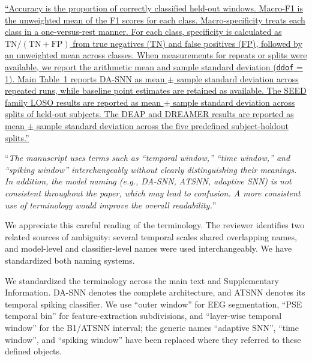 \documentclass[12pt,technote,onecolumn]{IEEEtran}
\begin{document}
\uline{``Accuracy is the proportion of correctly classified held-out windows. Macro-F1 is the unweighted mean of the F1 scores for each class. Macro-specificity treats each class in a one-versus-rest manner. For each class, specificity is calculated as $\mathrm{TN}/(\mathrm{TN}+\mathrm{FP})$ from true negatives (TN) and false positives (FP), followed by an unweighted mean across classes. When measurements for repeats or splits were available, we report the arithmetic mean and sample standard deviation (\texttt{ddof} = 1). Main Table~1 reports DA-SNN as mean $\pm$ sample standard deviation across repeated runs, while baseline point estimates are retained as available. The SEED family LOSO results are reported as mean $\pm$ sample standard deviation across splits of held-out subjects. The DEAP and DREAMER results are reported as mean $\pm$ sample standard deviation across the five predefined subject-holdout splits.''}

\EvidenceMainTableOne
\EvidenceSuppTableSSix
\EvidenceSuppTableSSeven
\EvidenceSuppTableSEight

\vspace{4mm}

``{\it The manuscript uses terms such as ``temporal window,'' ``time window,''
and ``spiking window'' interchangeably without clearly distinguishing
their meanings. In addition, the model naming (e.g., DA-SNN, ATSNN,
adaptive SNN) is not consistent throughout the paper, which may lead to
confusion. A more consistent use of terminology would improve the
overall readability.}''
\vspace{1mm}


We appreciate this careful reading of the terminology. The reviewer identifies two related sources of ambiguity: several temporal scales shared overlapping names, and model-level and classifier-level names were used interchangeably. We have standardized both naming systems.

We standardized the terminology across the main text and Supplementary
Information. DA-SNN denotes the complete architecture, and ATSNN denotes
its temporal spiking classifier. We use ``outer window'' for EEG
segmentation, ``PSE temporal bin'' for feature-extraction subdivisions,
and ``layer-wise temporal window'' for the B1/ATSNN interval; the
generic names ``adaptive SNN'', ``time window'', and ``spiking window''
have been replaced where they referred to these defined objects.
\end{document}
